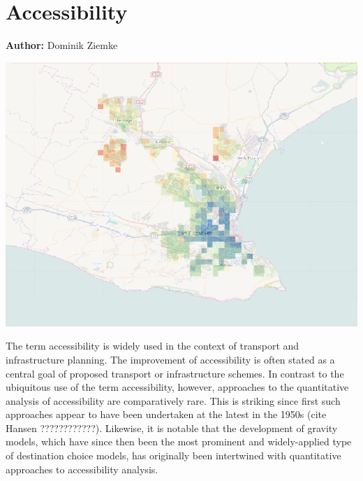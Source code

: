 \chapter{Accessibility }
\label{ch:accessibility}

\hfill \textbf{Author:} Dominik Ziemke

\begin{center} \includegraphics[width=1.\textwidth, angle=0]{extending/figures/accessibility/w_freeSpeed_snapshot.png} \end{center}


The term accessibility is widely used in the context of transport and infrastructure planning. The improvement of accessibility is often stated as a central goal of proposed transport or infrastructure schemes. In contrast to the ubiquitous use of the term accessibility, however, approaches to the quantitative analysis of accessibility are comparatively rare. This is striking since first such approaches appear to have been undertaken at the latest in the 1950s (cite Hansen ????????????). Likewise, it is notable that the development of gravity models, which have since then been the most prominent and widely-applied type of destination choice models, has originally been intertwined with quantitative approaches to accessibility analysis.

